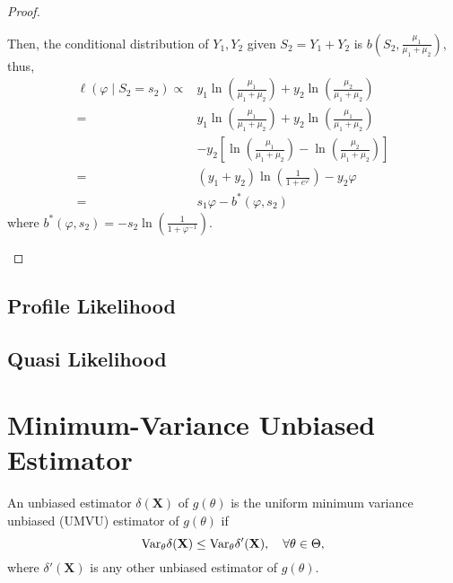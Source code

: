 \begin{proof}
\begin{enumerate}
		      Then, the conditional distribution of $Y_{1},Y_{2}$ given $S_{2}=Y_{1}+Y_{2}$ is $b\left(S_{2},\frac{\mu_{1}}{\mu_{1}+\mu_{2}}\right)$, thus,
		      \begin{equation*}
			      \begin{aligned}
				      \ell\left(\varphi\mid S_{2}=s_{2}\right)\propto & y_{1}\ln\left(\frac{\mu_{1}}{\mu_{1}+\mu_{2}}\right)+y_{2}\ln\left(\frac{\mu_{2}}{\mu_{1}+\mu_{2}}\right)          \\
				      =                                               & y_{1}\ln\left(\frac{\mu_{1}}{\mu_{1}+\mu_{2}}\right)+y_{2}\ln\left(\frac{\mu_{1}}{\mu_{1}+\mu_{2}}\right)          \\
				                                                      & -y_{2}\left[\ln\left(\frac{\mu_{1}}{\mu_{1}+\mu_{2}}\right)-\ln\left(\frac{\mu_{2}}{\mu_{1}+\mu_{2}}\right)\right] \\
				      =                                               & \left(y_{1}+y_{2}\right)\ln\left(\frac{1}{1+e^{\varphi}}\right)-y_{2}\varphi                                       \\
				      =                                               & s_{1}\varphi-b^{*}\left(\varphi,s_{2}\right)
			      \end{aligned}
		      \end{equation*}
		      where $b^{*}\left(\varphi,s_{2}\right)=-s_{2}\ln\left(\frac{1}{1+\varphi^{-1}}\right)$.
	\end{enumerate}
\end{proof}

\subsection{Profile Likelihood}

\subsection{Quasi Likelihood}

\section{Minimum-Variance Unbiased Estimator}

\begin{definition}
	An unbiased estimator $\delta(\textbf{X})$ of $g(\theta)$ is the uniform minimum variance unbiased (UMVU) estimator of $g(\theta)$ if
	\begin{equation}
		\mathrm{Var}_{\theta}\delta(\textbf{X})\leq\mathrm{Var}_{\theta}\delta'(\textbf{X}),\quad\forall\theta\in\Theta,
	\end{equation}
	where $\delta'(\textbf{X})$ is any other unbiased estimator of $g(\theta)$.
\end{definition}

